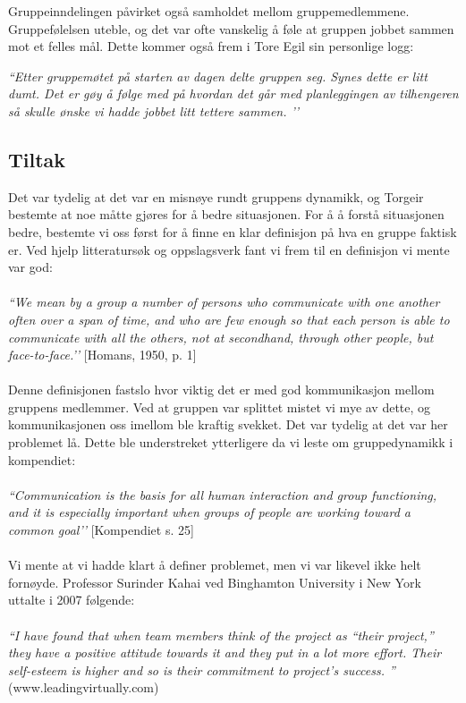 Gruppeinndelingen påvirket også samholdet mellom gruppemedlemmene. Gruppefølelsen uteble, og det var ofte vanskelig å føle at gruppen jobbet sammen mot et felles mål. Dette kommer også frem i Tore Egil sin personlige logg:\newline

\emph{``Etter gruppemøtet på starten av dagen delte gruppen seg. Synes dette er litt dumt. Det er gøy å følge med på hvordan det går med planleggingen av tilhengeren så skulle ønske vi hadde jobbet litt tettere sammen. ’’}

\subsection{Tiltak}
Det var tydelig at det var en misnøye rundt gruppens dynamikk, og Torgeir bestemte at noe måtte gjøres for å bedre situasjonen. For å å forstå situasjonen bedre, bestemte vi oss først for å finne en klar definisjon på hva en gruppe faktisk er. Ved hjelp litteratursøk og oppslagsverk fant vi frem til en definisjon vi mente var god:\\\\
\emph{``We mean by a group a number of persons who communicate with one another often over a span of time, and who are few enough so that each person is able to communicate with all the others, not at secondhand, through other people, but face-to-face.’’} [Homans, 1950, p. 1]\\\\
Denne definisjonen fastslo hvor viktig det er med god kommunikasjon mellom gruppens medlemmer. Ved at gruppen var splittet mistet vi mye av dette, og kommunikasjonen oss imellom ble kraftig svekket. Det var tydelig at det var her problemet lå. Dette ble understreket ytterligere da vi leste om gruppedynamikk i kompendiet:\\\\
\emph{``Communication is the basis for all human interaction and group functioning, and it is especially important when groups of people are working toward a common goal’’} [Kompendiet s. 25]\\\\
Vi mente at vi hadde klart å definer problemet, men vi var likevel ikke helt fornøyde. Professor Surinder Kahai ved Binghamton University i New York uttalte i 2007 følgende:\\\\
\emph{``I have found that when team members think of the project as “their project,” they have a positive attitude towards it and they put in a lot more effort. Their self-esteem is higher and so is their commitment to project’s success. ''} (www.leadingvirtually.com)\newline

